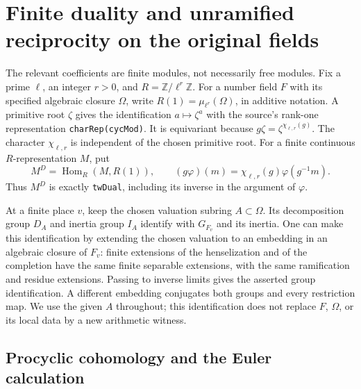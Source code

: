 \section{Finite duality and unramified reciprocity on the original fields}
\label{sec:local-duality-closure}


The relevant coefficients are finite modules, not necessarily free
modules.  Fix a prime $\ell$, an integer $r>0$, and
$R=\mathbb Z/\ell^r\mathbb Z$.  For a number field $F$ with its specified
algebraic closure $\Omega$, write $R(1)=\mu_{\ell^r}(\Omega)$, in additive
notation.  A primitive root $\zeta$ gives the identification
$a\mapsto\zeta^a$ with the source's rank-one representation
\texttt{charRep(cycMod)}.  It is equivariant because
$g\zeta=\zeta^{\chi_{\ell,r}(g)}$.  The character
$\chi_{\ell,r}$ is independent of the chosen primitive root.
For a finite continuous $R$-representation $M$, put
\[
 M^D=\operatorname{Hom}_R(M,R(1)),\qquad
 (g\varphi)(m)=\chi_{\ell,r}(g)\varphi(g^{-1}m).
 \tag{LD.1}
\]
Thus $M^D$ is exactly \texttt{twDual}, including its inverse in the
argument of $\varphi$.

At a finite place $v$, keep the chosen valuation subring $A\subset\Omega$.
Its decomposition group $D_A$ and inertia group $I_A$ identify with
$G_{F_v}$ and its inertia.  One can make this identification by extending
the chosen valuation to an embedding in an algebraic closure of $F_v$:
finite extensions of the henselization and of the completion have the
same finite separable extensions, with the same ramification and residue
extensions.  Passing to inverse limits gives the asserted group
identification.  A different embedding conjugates both groups and every
restriction map.  We use the given $A$ throughout; this identification
does not replace $F$, $\Omega$, or its local data by a new arithmetic
witness.

\subsection{Procyclic cohomology and the Euler calculation}


